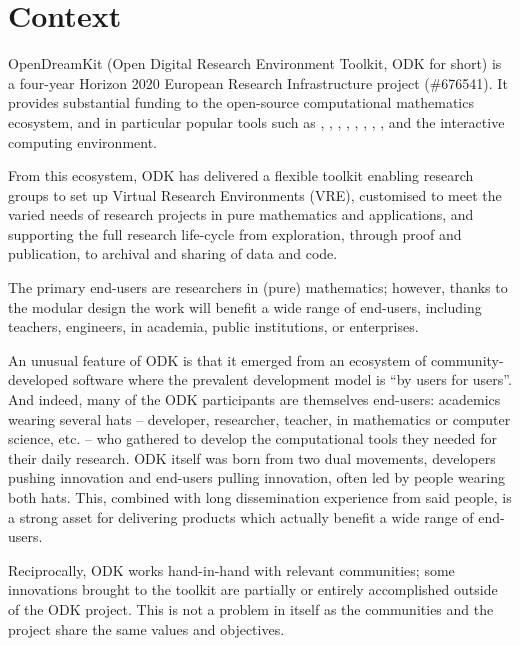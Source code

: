 \documentclass{deliverablereport}
\author{Nicolas M. Thiéry et al.}
\begin{document}
\enlargethispage{4ex}
\maketitle
\githubissuedescription
\tableofcontents\newpage


\section{Context}

OpenDreamKit (Open Digital Research Environment Toolkit, ODK for
short) is a four-year Horizon 2020 European Research Infrastructure
project (\#676541). It provides substantial funding to the open-source
computational mathematics ecosystem, and in particular popular tools
such as \Linbox, \MPIR, \Sage, \GAP, \PariGP, \LMFDB, \Singular,
\MathHub, and the \Jupyter interactive computing environment.

From this ecosystem, ODK has delivered a flexible toolkit
enabling research groups to set up Virtual Research Environments
(VRE), customised to meet the varied needs of research projects in
pure mathematics and applications, and supporting the full research
life-cycle from exploration, through proof and publication, to
archival and sharing of data and code.

The primary end-users are researchers in (pure) mathematics; however,
thanks to the modular design the work will benefit a wide range of
end-users, including teachers, engineers, in academia, public
institutions, or enterprises.

An unusual feature of ODK is that it emerged from an ecosystem of
community-developed software where the prevalent development model is
``by users for users''. And indeed, many of the ODK participants are
themselves end-users: academics wearing several hats -- developer,
researcher, teacher, in mathematics or computer science, etc. -- who
gathered to develop the computational tools they needed for their daily
research. ODK itself was born from two dual movements,
developers pushing innovation and end-users pulling innovation,
often led by people wearing both hats. This, combined with long
dissemination experience from said people, is a strong asset for
delivering products which actually benefit a wide range of end-users.

Reciprocally, ODK works hand-in-hand with relevant communities; some
innovations brought to the toolkit are partially or entirely
accomplished outside of the ODK project. This is not a
problem in itself as the communities and the project share the same
values and objectives.
\end{document}
